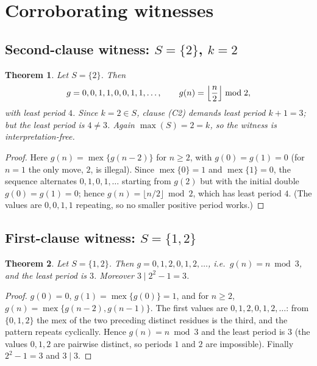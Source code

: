 \documentclass[11pt]{article}
\newtheorem{theorem}{Theorem}
\theoremstyle{definition}
\theoremstyle{remark}
\newcommand{\mex}{\operatorname{mex}}
\begin{document}
\section{Corroborating witnesses}
\label{sec:corroborating}

\subsection*{Second-clause witness: $S = \{2\}$, $k = 2$}

\begin{theorem}\label{thm:secondary}
Let $S = \{2\}$. Then
\[
g = 0, 0, 1, 1, 0, 0, 1, 1, \dots, \qquad g(n) = \Bigl\lfloor \frac{n}{2}
\Bigr\rfloor \bmod 2,
\]
with least period $4$. Since $k = 2 \in S$, clause (C2) demands least period
$k+1 = 3$; but the least period is $4 \ne 3$. Again $\max(S) = 2 = k$, so the
witness is interpretation-free.
\end{theorem}

\begin{proof}
Here $g(n) = \mex\{g(n-2)\}$ for $n \ge 2$, with $g(0)=g(1)=0$ (for $n=1$ the
only move, $2$, is illegal). Since $\mex\{0\}=1$ and $\mex\{1\}=0$, the
sequence alternates $0,1,0,1,\dots$ starting from $g(2)$ but with the initial
double $g(0)=g(1)=0$; hence $g(n) = \lfloor n/2 \rfloor \bmod 2$, which has
least period $4$. (The values are $0,0,1,1$ repeating, so no smaller positive
period works.)
\end{proof}

\subsection*{First-clause witness: $S = \{1,2\}$}

\begin{theorem}\label{thm:clause1}
Let $S = \{1,2\}$. Then $g = 0,1,2,0,1,2,\dots$, i.e.\ $g(n) = n \bmod 3$, and
the least period is $3$. Moreover $3 \mid 2^2 - 1 = 3$.
\end{theorem}

\begin{proof}
$g(0)=0$, $g(1)=\mex\{g(0)\}=1$, and for $n \ge 2$,
$g(n)=\mex\{g(n-2),g(n-1)\}$. The first values are $0,1,2,0,1,2,\dots$: from
$\{0,1,2\}$ the mex of the two preceding distinct residues is the third, and
the pattern repeats cyclically. Hence $g(n) = n \bmod 3$ and the least period is
$3$ (the values $0,1,2$ are pairwise distinct, so periods $1$ and $2$ are
impossible). Finally $2^2 - 1 = 3$ and $3 \mid 3$.
\end{proof}
\end{document}
